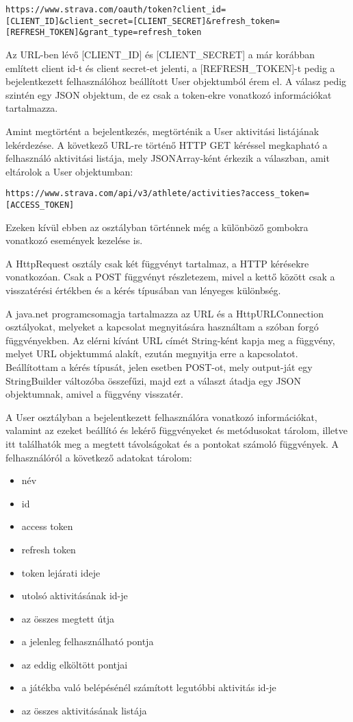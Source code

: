 \begin{verbatim}
https://www.strava.com/oauth/token?client_id=[CLIENT_ID]&client_secret=[CLIENT_SECRET]&refresh_token=[REFRESH_TOKEN]&grant_type=refresh_token 
\end{verbatim}

Az URL-ben lévő [CLIENT\_ID] és [CLIENT\_SECRET] a már korábban említett client id-t és client secret-et jelenti, a [REFRESH\_TOKEN]-t pedig a bejelentkezett felhasználóhoz beállított User objektumból érem el. A válasz pedig szintén egy JSON objektum, de ez csak a token-ekre vonatkozó információkat tartalmazza. 

Amint megtörtént a bejelentkezés, megtörténik a User aktivitási listájának lekérdezése. A következő URL-re történő HTTP GET kéréssel megkapható a felhasználó aktivitási listája, mely JSONArray-ként érkezik a válaszban, amit eltárolok a User objektumban:

\begin{verbatim}
https://www.strava.com/api/v3/athlete/activities?access_token=[ACCESS_TOKEN] 
\end{verbatim}


Ezeken kívül ebben az osztályban történnek még a különböző gombokra vonatkozó események kezelése is. 

A HttpRequest osztály csak két függvényt tartalmaz, a HTTP kérésekre vonatkozóan. Csak a POST függvényt részletezem, mivel a kettő között csak a visszatérési értékben és a kérés típusában van lényeges különbség. 

A java.net programcsomagja tartalmazza az URL és a HttpURLConnection osztályokat, melyeket a kapcsolat megnyitására használtam a szóban forgó függvényekben. Az elérni kívánt URL címét String-ként kapja meg a függvény, melyet URL objektummá alakít, ezután megnyitja erre a kapcsolatot. Beállítottam a kérés típusát, jelen esetben POST-ot, mely output-ját egy StringBuilder változóba összefűzi, majd ezt a választ átadja egy JSON objektumnak, amivel a függvény visszatér. 

A User osztályban a bejelentkezett felhasználóra vonatkozó információkat, valamint az ezeket beállító és lekérő függvényeket és metódusokat tárolom, illetve itt találhatók meg a megtett távolságokat és a pontokat számoló függvények. A felhasználóról a következő adatokat tárolom: 

\begin{itemize}
\item név 
\item id 
\item access token 
\item refresh token 
\item token lejárati ideje 
\item utolsó aktivitásának id-je 
\item az összes megtett útja 
\item a jelenleg felhasználható pontja 
\item az eddig elköltött pontjai 
\item a játékba való belépésénél számított legutóbbi aktivitás id-je 
\item az összes aktivitásának listája
\end{itemize}


